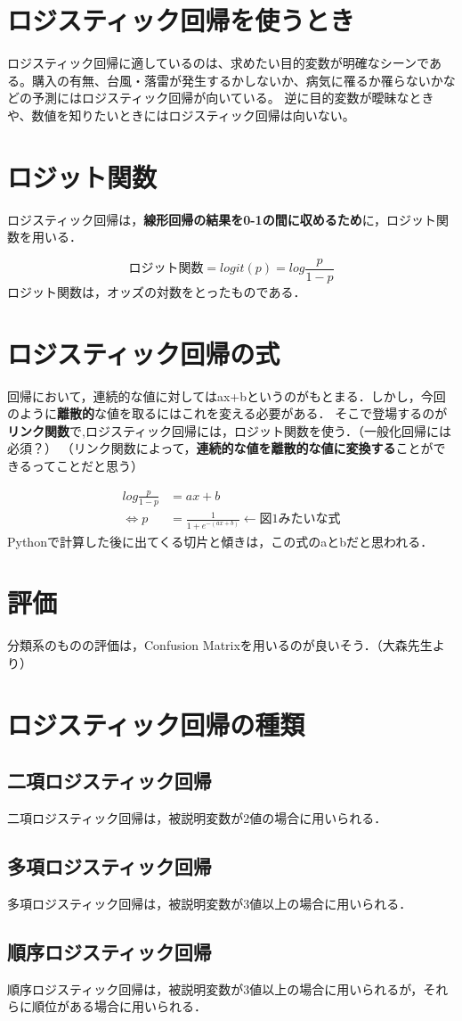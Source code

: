 \documentclass[a4paper,upLaTeX,luatex,12pt]{ltjsarticle}
\begin{document}
\section{ロジスティック回帰を使うとき}
ロジスティック回帰に適しているのは、求めたい目的変数が明確なシーンである。購入の有無、台風・落雷が発生するかしないか、病気に罹るか罹らないかなどの予測にはロジスティック回帰が向いている。
逆に目的変数が曖昧なときや、数値を知りたいときにはロジスティック回帰は向いない。
\section{ロジット関数}
ロジスティック回帰は，\textbf{線形回帰の結果を0-1の間に収めるため}に，ロジット関数を用いる．\par
\begin{equation}
  ロジット関数=logit(p)=log\frac{p}{1-p}
\end{equation}
ロジット関数は，オッズの対数をとったものである．\par
\section{ロジスティック回帰の式}
回帰において，連続的な値に対してはax+bというのがもとまる．しかし，今回のように\textbf{離散的}な値を取るにはこれを変える必要がある．
そこで登場するのが\textbf{リンク関数}で,ロジスティック回帰には，ロジット関数を使う．（一般化回帰には必須？）
（リンク関数によって，\textbf{連続的な値を離散的な値に変換する}ことができるってことだと思う）\par
\begin{align}
  log\frac{p}{1-p}  & =ax+b                             \\
  \Leftrightarrow p & =\frac{1}{1+e^{-(ax+b)}} ←図1みたいな式
\end{align}
Pythonで計算した後に出てくる切片と傾きは，この式のaとbだと思われる．\par
\section{評価}
分類系のものの評価は，Confusion Matrixを用いるのが良いそう．（大森先生より）\par
\section{ロジスティック回帰の種類}
\subsection{二項ロジスティック回帰}
二項ロジスティック回帰は，被説明変数が2値の場合に用いられる．\par
\subsection{多項ロジスティック回帰}
多項ロジスティック回帰は，被説明変数が3値以上の場合に用いられる．\par
\subsection{順序ロジスティック回帰}
順序ロジスティック回帰は，被説明変数が3値以上の場合に用いられるが，それらに順位がある場合に用いられる．\par
\end{document}
